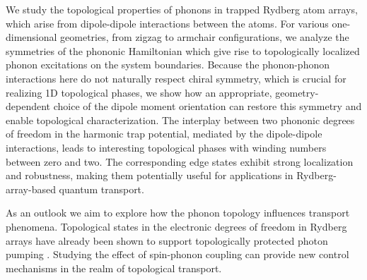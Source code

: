 We study the topological properties of phonons in trapped Rydberg atom arrays, which arise from dipole-dipole interactions between the atoms. For various one-dimensional geometries, from zigzag to armchair configurations, we analyze the symmetries of the phononic Hamiltonian which give rise to topologically localized phonon excitations on the system boundaries. Because the phonon-phonon interactions here do not naturally respect chiral symmetry, which is crucial for realizing 1D topological phases, we show how an appropriate, geometry-dependent choice of the dipole moment orientation can restore this symmetry and enable topological characterization. The interplay between two phononic degrees of freedom in the harmonic trap potential, mediated by the dipole-dipole interactions, leads to interesting topological phases with winding numbers between zero and two. The corresponding edge states exhibit strong localization and robustness, making them potentially useful for applications in Rydberg-array-based quantum transport. 

As an outlook we aim to explore how the phonon topology influences transport phenomena. Topological states in the electronic degrees of freedom in Rydberg arrays have already been shown to support topologically protected photon pumping \cite{citroThoulessPumpingTopology2023,nakajimaTopologicalThoulessPumping2016,lohseThoulessQuantumPump2016,meidanTopologicalClassificationInteractiondriven201,tangpanitanonTopologicalPumpingPhotons2016}. Studying the effect of spin-phonon coupling can provide new control mechanisms in the realm of topological transport.


